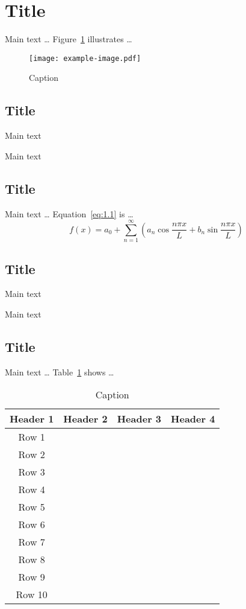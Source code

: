 \documentclass[degree=doctor,language=english]{thuthesis}
\begin{document}
\section{Title}

Main text … Figure~\ref{fig:1.1} illustrates …

\begin{figure}
  \centering
  \texttt{[image: example-image.pdf]}
  \caption{Caption}
  \label{fig:1.1}
\end{figure}

\subsection{Title}

Main text

Main text

\subsection{Title}

Main text … Equation~\eqref{eq:1.1} is …
\begin{equation}
  f(x) = a_0 + \sum_{n=1}^\infty \left( a_n \cos⁡ \frac{n \pi x}{L}
    + b_n \sin⁡ \frac{n \pi x}{L} \right)
  \label{eq:1.1}
\end{equation}

\subsection{Title}

Main text

Main text

\subsection{Title}

Main text … Table~\ref{tab:1.1} shows …

\begin{table}
  \centering
  \caption{Caption}
  \label{tab:1.1}
  \begin{tabular}{cccc}
    \toprule
    Header 1 & Header 2 & Header 3 & Header 4 \\
    \midrule
    Row 1 &  &  & \\
    Row 2 &  &  & \\
    Row 3 &  &  & \\
    Row 4 &  &  & \\
    Row 5 &  &  & \\
    Row 6 &  &  & \\
    Row 7 &  &  & \\
    Row 8 &  &  & \\
    Row 9 &  &  & \\
    Row 10 &  &  & \\
    \bottomrule
  \end{tabular}
\end{table}
\end{document}
